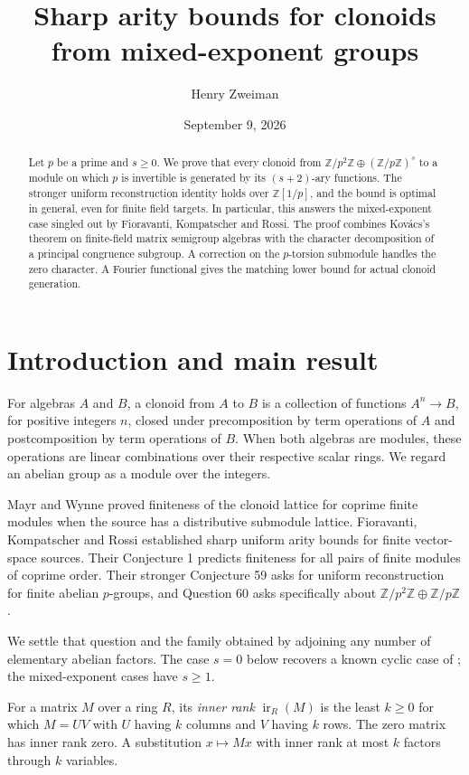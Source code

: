 \documentclass[11pt]{article}
\title{Sharp arity bounds for clonoids from mixed-exponent groups}
\author{Henry Zweiman}
\date{September 9, 2026}
\theoremstyle{remark}\newtheorem{remark}[theorem]{Remark}
\newcommand{\Z}{\mathbb Z}
\newcommand{\ir}{\operatorname{ir}}
\begin{document}
\maketitle
\begin{abstract}
Let $p$ be a prime and $s\ge0$. We prove that every clonoid from
$\Z/p^2\Z\oplus(\Z/p\Z)^s$ to a module on which $p$ is invertible is generated by its $(s+2)$-ary functions. The stronger uniform reconstruction identity holds over $\Z[1/p]$, and the bound is optimal in general, even for finite field targets. In particular, this answers the mixed-exponent case singled out by Fioravanti, Kompatscher and Rossi. The proof combines Kov\'acs's theorem on finite-field matrix semigroup algebras with the character decomposition of a principal congruence subgroup. A correction on the $p$-torsion submodule handles the zero character. A Fourier functional gives the matching lower bound for actual clonoid generation.
\end{abstract}

\section{Introduction and main result}

For algebras $A$ and $B$, a clonoid from $A$ to $B$ is a collection of functions $A^n\to B$, for positive integers $n$, closed under precomposition by term operations of $A$ and postcomposition by term operations of $B$. When both algebras are modules, these operations are linear combinations over their respective scalar rings. We regard an abelian group as a module over the integers.

Mayr and Wynne \cite{MW} proved finiteness of the clonoid lattice for coprime finite modules when the source has a distributive submodule lattice. Fioravanti, Kompatscher and Rossi \cite{FKR} established sharp uniform arity bounds for finite vector-space sources. Their Conjecture 1 predicts finiteness for all pairs of finite modules of coprime order. Their stronger Conjecture 59 asks for uniform reconstruction for finite abelian $p$-groups, and Question 60 asks specifically about $\Z/p^2\Z\oplus\Z/p\Z$.

We settle that question and the family obtained by adjoining any number of elementary abelian factors. The case $s=0$ below recovers a known cyclic case of \cite{MW}; the mixed-exponent cases have $s\ge1$.

For a matrix $M$ over a ring $R$, its \emph{inner rank} $\ir_R(M)$ is the least $k\ge0$ for which $M=UV$ with $U$ having $k$ columns and $V$ having $k$ rows. The zero matrix has inner rank zero. A substitution $x\mapsto Mx$ with inner rank at most $k$ factors through $k$ variables.
\end{document}
